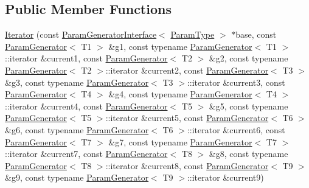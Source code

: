 \subsection*{\-Public \-Member \-Functions}
\begin{DoxyCompactItemize}
\item 
\hyperlink{classtesting_1_1internal_1_1CartesianProductGenerator9_1_1Iterator_abe206366be897258bed53f9a73372218}{\-Iterator} (const \hyperlink{classtesting_1_1internal_1_1ParamGeneratorInterface}{\-Param\-Generator\-Interface}$<$ \hyperlink{classtesting_1_1internal_1_1CartesianProductGenerator9_a311b2d1d5a489d4841f258a70f33bf9d}{\-Param\-Type} $>$ $\ast$base, const \hyperlink{classtesting_1_1internal_1_1ParamGenerator}{\-Param\-Generator}$<$ \-T1 $>$ \&g1, const typename \hyperlink{classtesting_1_1internal_1_1ParamGenerator}{\-Param\-Generator}$<$ \-T1 $>$\-::iterator \&current1, const \hyperlink{classtesting_1_1internal_1_1ParamGenerator}{\-Param\-Generator}$<$ \-T2 $>$ \&g2, const typename \hyperlink{classtesting_1_1internal_1_1ParamGenerator}{\-Param\-Generator}$<$ \-T2 $>$\-::iterator \&current2, const \hyperlink{classtesting_1_1internal_1_1ParamGenerator}{\-Param\-Generator}$<$ \-T3 $>$ \&g3, const typename \hyperlink{classtesting_1_1internal_1_1ParamGenerator}{\-Param\-Generator}$<$ \-T3 $>$\-::iterator \&current3, const \hyperlink{classtesting_1_1internal_1_1ParamGenerator}{\-Param\-Generator}$<$ \-T4 $>$ \&g4, const typename \hyperlink{classtesting_1_1internal_1_1ParamGenerator}{\-Param\-Generator}$<$ \-T4 $>$\-::iterator \&current4, const \hyperlink{classtesting_1_1internal_1_1ParamGenerator}{\-Param\-Generator}$<$ \-T5 $>$ \&g5, const typename \hyperlink{classtesting_1_1internal_1_1ParamGenerator}{\-Param\-Generator}$<$ \-T5 $>$\-::iterator \&current5, const \hyperlink{classtesting_1_1internal_1_1ParamGenerator}{\-Param\-Generator}$<$ \-T6 $>$ \&g6, const typename \hyperlink{classtesting_1_1internal_1_1ParamGenerator}{\-Param\-Generator}$<$ \-T6 $>$\-::iterator \&current6, const \hyperlink{classtesting_1_1internal_1_1ParamGenerator}{\-Param\-Generator}$<$ \-T7 $>$ \&g7, const typename \hyperlink{classtesting_1_1internal_1_1ParamGenerator}{\-Param\-Generator}$<$ \-T7 $>$\-::iterator \&current7, const \hyperlink{classtesting_1_1internal_1_1ParamGenerator}{\-Param\-Generator}$<$ \-T8 $>$ \&g8, const typename \hyperlink{classtesting_1_1internal_1_1ParamGenerator}{\-Param\-Generator}$<$ \-T8 $>$\-::iterator \&current8, const \hyperlink{classtesting_1_1internal_1_1ParamGenerator}{\-Param\-Generator}$<$ \-T9 $>$ \&g9, const typename \hyperlink{classtesting_1_1internal_1_1ParamGenerator}{\-Param\-Generator}$<$ \-T9 $>$\-::iterator \&current9)

\end{DoxyCompactItemize}
